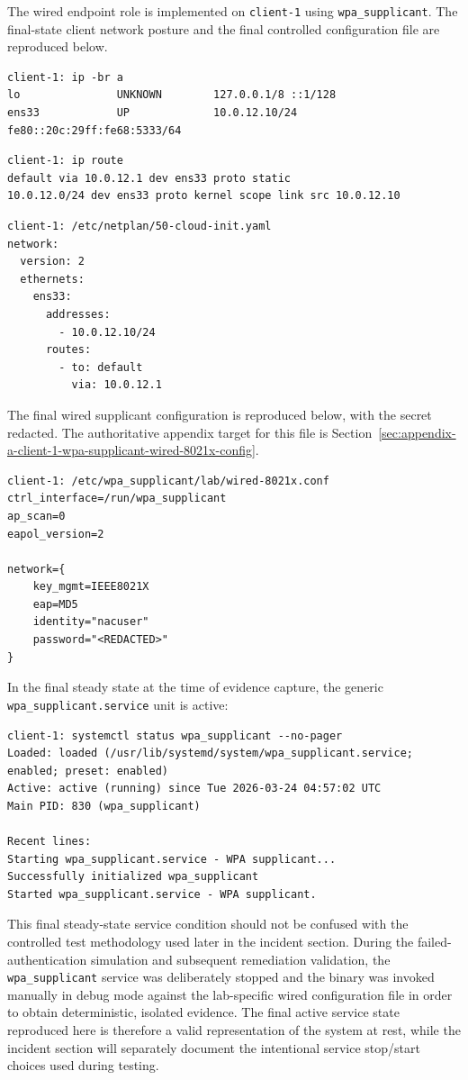 \documentclass[11pt]{article}
\begin{document}
The wired endpoint role is implemented on \texttt{client-1} using \texttt{wpa\_supplicant}. The final-state client network posture and the final controlled configuration file are reproduced below.

\begin{verbatim}
client-1: ip -br a
lo               UNKNOWN        127.0.0.1/8 ::1/128
ens33            UP             10.0.12.10/24 fe80::20c:29ff:fe68:5333/64
\end{verbatim}

\begin{verbatim}
client-1: ip route
default via 10.0.12.1 dev ens33 proto static
10.0.12.0/24 dev ens33 proto kernel scope link src 10.0.12.10
\end{verbatim}

\begin{verbatim}
client-1: /etc/netplan/50-cloud-init.yaml
network:
  version: 2
  ethernets:
    ens33:
      addresses:
        - 10.0.12.10/24
      routes:
        - to: default
          via: 10.0.12.1
\end{verbatim}

The final wired supplicant configuration is reproduced below, with the secret redacted. The authoritative appendix target for this file is Section~\ref{sec:appendix-a-client-1-wpa-supplicant-wired-8021x-config}.

\begin{verbatim}
client-1: /etc/wpa_supplicant/lab/wired-8021x.conf
ctrl_interface=/run/wpa_supplicant
ap_scan=0
eapol_version=2

network={
    key_mgmt=IEEE8021X
    eap=MD5
    identity="nacuser"
    password="<REDACTED>"
}
\end{verbatim}

In the final steady state at the time of evidence capture, the generic \texttt{wpa\_supplicant.service} unit is active:

\begin{verbatim}
client-1: systemctl status wpa_supplicant --no-pager
Loaded: loaded (/usr/lib/systemd/system/wpa_supplicant.service; enabled; preset: enabled)
Active: active (running) since Tue 2026-03-24 04:57:02 UTC
Main PID: 830 (wpa_supplicant)

Recent lines:
Starting wpa_supplicant.service - WPA supplicant...
Successfully initialized wpa_supplicant
Started wpa_supplicant.service - WPA supplicant.
\end{verbatim}

This final steady-state service condition should not be confused with the controlled test methodology used later in the incident section. During the failed-authentication simulation and subsequent remediation validation, the \texttt{wpa\_supplicant} service was deliberately stopped and the binary was invoked manually in debug mode against the lab-specific wired configuration file in order to obtain deterministic, isolated evidence. The final active service state reproduced here is therefore a valid representation of the system at rest, while the incident section will separately document the intentional service stop/start choices used during testing.
\end{document}
